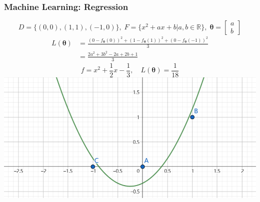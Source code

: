 \documentclass{beamer}
\begin{document}
\begin{frame}
    \frametitle{Machine Learning: Regression}

    \[D = \{(0, 0), (1, 1), (-1, 0)\},\; F = \{x^2 + ax + b \vert a, b \in \mathbb{R}\}, \;\boldsymbol{\theta} = \begin{bmatrix}
        a \\
        b
    \end{bmatrix}\]
    \begin{align*}
        L(\boldsymbol{\theta}) &= \frac{(0 - f_{\boldsymbol{\theta}}(0))^2 + (1 - f_{\boldsymbol{\theta}}(1))^2 + (0 - f_{\boldsymbol{\theta}}(-1))^2}{3} \\
        &= \frac{2a^{2} + 3b^{2} - 2a + 2b + 1}{3}
    \end{align*}
    \[f = x^2 + \frac{1}{2}x - \frac{1}{3},\quad L(\boldsymbol{\theta}) = \frac{1}{18}\]
    \centering
    \includegraphics[height=.3\textheight]{res/function.png}

\end{frame}
\end{document}
